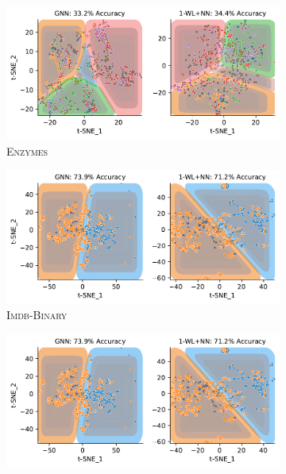 \begin{figure}
	\begin{subfigure}[b]{0.49\textwidth}
		\centering
		\includegraphics[width=\textwidth]{Figures/tsne_svm_lin_ENZYMES.pdf}
		\vspace*{-4ex} 
		\caption{\textsc{Enzymes}}
	\end{subfigure}
	\hfill
	\begin{subfigure}[b]{0.49\textwidth}
		\centering
		\includegraphics[width=\textwidth]{Figures/tsne_svm_lin_IMDB.pdf}
		\vspace*{-4ex} 
		\caption{\textsc{Imdb-Binary}}
	\end{subfigure}
	\par\bigskip
	\begin{subfigure}[b]{0.49\textwidth}
		\centering
		\includegraphics[width=\textwidth]{Figures/tsne_svm_lin_IMDB.pdf}

\end{subfigure}
\end{figure}
